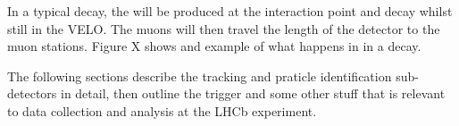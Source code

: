 In a typical \bsmumu decay, the \bs will be produced at the interaction point and decay whilst still in the VELO. The muons will then travel the length of the detector to the muon stations. Figure X shows and example of what happens in in a \bsmumu decay.

The following sections describe the tracking and praticle identification sub-detectors in detail, then outline the trigger and some other stuff that is relevant to data collection and analysis at the LHCb experiment. 
